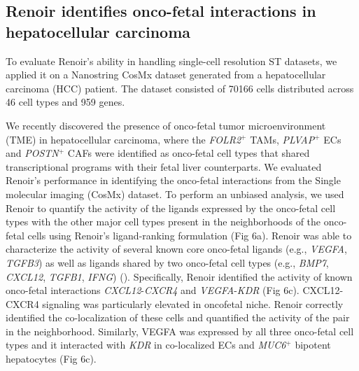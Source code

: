 
\subsection*{Renoir identifies onco-fetal interactions in hepatocellular carcinoma}
To evaluate Renoir's ability in handling single-cell resolution ST datasets, we applied it on a Nanostring CosMx dataset generated from a hepatocellular carcinoma (HCC) patient. The dataset consisted of 70166 cells distributed across 46 cell types and 959 genes. 

We recently \citep{SHARMA2020377,Li2024} discovered the presence of onco-fetal tumor microenvironment (TME) in hepatocellular carcinoma, where the \textit{FOLR2}$^{+}$ TAMs, \textit{PLVAP}$^{+}$ ECs and \textit{POSTN}$^{+}$ CAFs were identified as onco-fetal cell types that shared transcriptional programs with their fetal liver counterparts. We evaluated Renoir's performance in identifying the onco-fetal interactions from the Single molecular imaging (CosMx) dataset. To perform an unbiased analysis, we used Renoir to quantify the activity of the ligands expressed by the onco-fetal cell types with the other major cell types present in the neighborhoods of the onco-fetal cells using Renoir's ligand-ranking formulation (Fig 6a). Renoir was able to characterize the activity of several known core onco-fetal ligands (e.g., \textit{VEGFA}, \textit{TGFB3}) as well as ligands shared by two onco-fetal cell types (e.g., \textit{BMP7}, \textit{CXCL12}, \textit{TGFB1}, \textit{IFNG}) (\citep{Li2024}). Specifically, Renoir identified the activity of known onco-fetal interactions \textit{CXCL12}-\textit{CXCR4} and \textit{VEGFA}-\textit{KDR} (Fig 6c). CXCL12-CXCR4 signaling was particularly elevated in oncofetal niche. Renoir correctly identified the co-localization of these cells and quantified the activity of the pair in the neighborhood. Similarly, VEGFA was expressed by all three onco-fetal cell types and it interacted with \textit{KDR} in co-localized ECs and \textit{MUC6}$^{+}$ bipotent hepatocytes (Fig 6c). 


